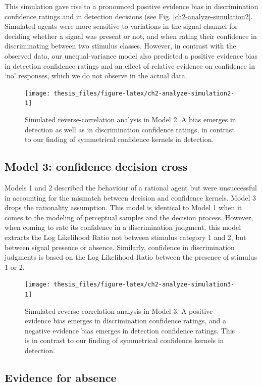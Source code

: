 \documentclass[12pt,twoside]{reedthesis}
\begin{document}
This simulation gave rise to a pronounced positive evidence bias in discrimination confidence ratings and in detection decisions (see Fig. \ref{ch2-analyze-simulation2}. Simulated agents were more sensitive to variations in the signal channel for deciding whether a signal was present or not, and when rating their confidence in discriminating between two stimulus classes. However, in contrast with the observed data, our unequal-variance model also predicted a positive evidence bias in detection confidence ratings and an effect of relative evidence on confidence in `no' responses, which we do not observe in the actual data.
\begin{figure}
\texttt{[image: thesis\_files/figure-latex/ch2-analyze-simulation2-1]} \caption[Simulation results: Model 2]{Simulated reverse-correlation analysis in Model 2. A bias emerges in detection as well as in discrimination confidence ratings, in contrast to our finding of symmetrical confidence kernels in detection.}\label{fig:ch2-analyze-simulation2}
\end{figure}
\hypertarget{model-3-confidence-decision-cross}{%
\subsection{Model 3: confidence decision cross}\label{model-3-confidence-decision-cross}}

Models 1 and 2 described the behaviour of a rational agent but were unsuccessful in accounting for the mismatch between decision and confidence kernels. Model 3 drops the rationality assumption. This model is identical to Model 1 when it comes to the modeling of perceptual samples and the decision process. However, when coming to rate its confidence in a discrimination judgment, this model extracts the Log Likelihood Ratio not between stimulus category 1 and 2, but between signal presence or absence. Similarly, confidence in discrimination judgments is based on the Log Likelihood Ratio between the presenec of stimulus 1 or 2.
\begin{figure}
\texttt{[image: thesis\_files/figure-latex/ch2-analyze-simulation3-1]} \caption[Simulation results: Model 2]{Simulated reverse-correlation analysis in Model 3. A positive evidence bias emerges in discrimination confidence ratings, and a negative evidence bias emerges in detection confidence ratings. This is in contrast to our finding of symmetrical confidence kernels in detection.}\label{fig:ch2-analyze-simulation3}
\end{figure}
\hypertarget{evidence-for-absence}{%
\subsection{Evidence for absence}\label{evidence-for-absence}}
\end{document}
